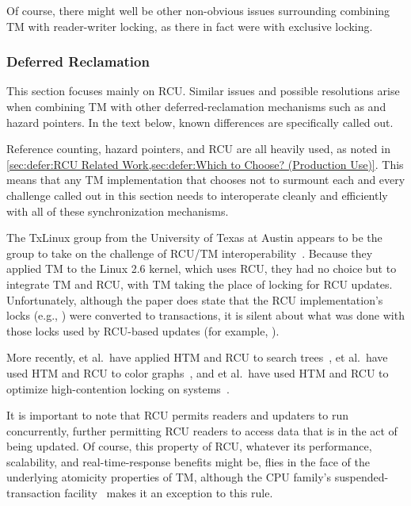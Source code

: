 Of course, there might well be other non-obvious issues surrounding
combining TM with reader-writer locking, as there in fact were with
exclusive locking.

\subsubsection{Deferred Reclamation}
\label{sec:future:Deferred Reclamation}

This section focuses mainly on RCU\@.
Similar issues and possible resolutions arise when combining TM with
other deferred-reclamation mechanisms such as
 and
hazard pointers.
In the text below, known differences are specifically called out.

Reference counting, hazard pointers, and RCU are all heavily used, as noted in
\cref{sec:defer:RCU Related Work,sec:defer:Which to Choose? (Production Use)}.
This means that any TM implementation that chooses not to surmount each
and every challenge called out in this section needs to interoperate
cleanly and efficiently with all of these synchronization mechanisms.

The TxLinux group from the University of Texas at Austin appears to be
the group to take on the challenge of RCU/TM
interoperability~\cite{ChistopherJRossbach2007a}.
Because they applied TM to the Linux 2.6 kernel, which uses RCU, they
had no choice but to integrate TM and RCU, with TM taking the place of
locking for RCU updates.
Unfortunately, although the paper does state that the RCU implementation's
locks (e.g., ) were converted to transactions,
it is silent about what was done with those locks used by RCU-based updates
(for example, ).

More recently,  et al.~have applied
HTM and RCU to search trees~\cite{Siakavaras2017CombiningHA,DimitriosSiakavaras2020RCU-HTM-B+Trees},
 et al.~have used HTM and RCU to color
graphs~\cite{ChristinaGiannoula2018HTM-RCU-graphcoloring},
and
 et al.~have used HTM and RCU to optimize high-contention
locking on  systems~\cite{SeongJaePark2020HTMRCUlock}.

It is important to note that RCU permits readers and updaters to run
concurrently, further permitting RCU readers to access data that is in
the act of being updated.
Of course, this property of RCU, whatever its performance, scalability,
and real-time-response benefits might be, flies in the face of the
underlying atomicity properties of TM, although the  CPU family's
suspended-transaction facility~\cite{Le:2015:TMS:3266491.3266500} makes
it an exception to this rule.

